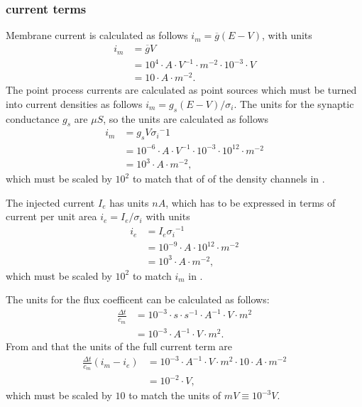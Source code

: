 \subsubsection{current terms}
Membrane current is calculated as follows $i_m = \overline{g}(E-V)$, with units
\begin{align}
    \unit{ i_m } &=  \unit{ \overline{g} } \unit{ V } \nonumber \\
                       &=  10^{4} \cdot A\cdot V^{-1}\cdot m^{-2} \cdot 10^{-3} \cdot V \nonumber \\
                       &=  10 \cdot A \cdot m^{-2}. \label{eq:im_unit}
\end{align}
The point process currents are calculated as point sources which must be turned into current densities as follows $i_m = g_s(E-V)/\sigma_i$.
The units for the synaptic conductance $g_s$ are $\mu S$, so the units are calculated as follows
\begin{align}
    \unit{ i_m } &=  \unit{ g_s } \unit{ V } \unit{\sigma_i}^-1 \nonumber \\
                 &=  10^{-6} \cdot A\cdot V^{-1} \cdot 10^{-3} \cdot 10^{12} \cdot m^{-2} \nonumber \\
                 &=  10^{3} \cdot A \cdot m^{-2}, \label{eq:ims_unit}
\end{align}
which must be scaled by $10^{2}$ to match that of of the density channels in .


The injected current $I_e$ has units $nA$, which has to be expressed in terms of current per unit area $i_e=I_e / \sigma_i$ with units
\begin{align}
    \unit{ i_e } &=  \unit{ I_e } \unit{ \sigma_i }^{-1} \nonumber \\
                       &=  10^{-9}\cdot A \cdot 10^{12} \cdot m^{-2} \nonumber \\
                       &=  10^{3} \cdot A \cdot m ^{-2}, \label{eq:ie_unit}
\end{align}
which must be scaled by $10^2$ to match $i_m$ in .

The units for the flux coefficent can be calculated as follows:
\begin{align}
    \unit{ \frac{\Delta t}{c_m} } &= 10^{-3} \cdot s \cdot s^{-1}\cdot A^{-1}\cdot V\cdot m^2 \nonumber \\
                                  &= 10^{-3} \cdot A^{-1} \cdot V\cdot m^2. \label{eq:dtcm_unit}
\end{align}
From  and  that the units of the full current term are
\begin{align}
    \unit{ \frac{\Delta t}{c_m}\left(i_m - i_e\right) }
        &= 10^{-3} \cdot A^{-1} \cdot V\cdot m^2 \cdot 10 \cdot A \cdot m^{-2} \nonumber \\
        &= 10^{-2} \cdot V,
\end{align}
which must be scaled by $10$ to match the units of $mV\equiv10^{-3}V$.
